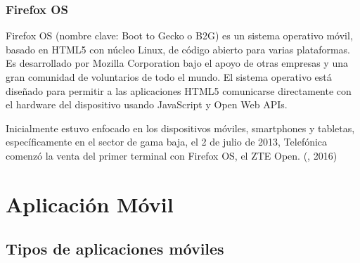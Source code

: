 \subsubsection{Firefox OS}
\setlength{\parskip}{5mm}
Firefox OS (nombre clave: Boot to Gecko o B2G) es un sistema operativo móvil, basado en HTML5 con núcleo Linux, de código abierto para varias plataformas. Es desarrollado por Mozilla Corporation bajo el apoyo de otras empresas y una gran comunidad de voluntarios de todo el mundo. El sistema operativo está diseñado para permitir a las aplicaciones HTML5 comunicarse directamente con el hardware del dispositivo usando JavaScript y Open Web APIs.

Inicialmente estuvo enfocado en los dispositivos móviles, smartphones y tabletas, específicamente en el sector de gama baja, el 2 de julio de 2013, Telefónica comenzó la venta del primer terminal con Firefox OS, el ZTE Open.
\setlength{\parskip}{0mm}
(\citet{firefoxbib}, 2016)




\section{Aplicación Móvil}	

\subsection{Tipos de aplicaciones móviles}

